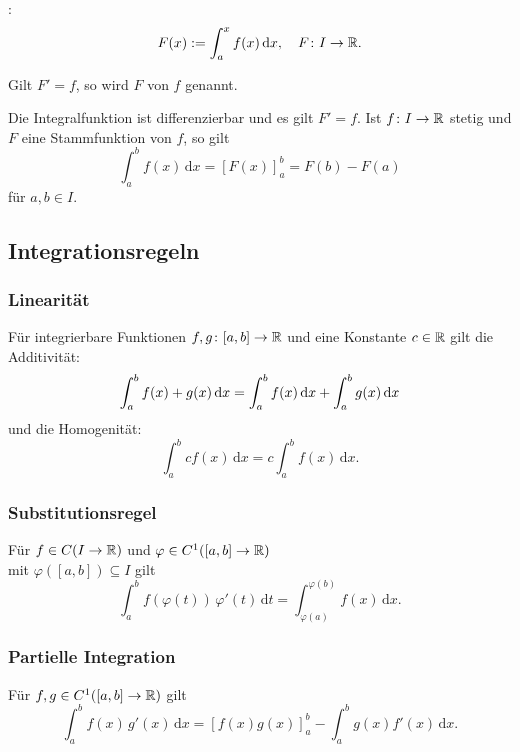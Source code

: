 \begin{definition}[Integralfunktion]
:
\begin{equation}
F(x):=\int_a^x f(x)\,\mathrm dx,\quad F\colon I\to\mathbb R.
\end{equation}
\end{definition}

\begin{definition}[Stammfunktion]
Gilt $F'=f$, so wird $F$  von $f$ genannt.
\end{definition}

Die Integralfunktion ist differenzierbar und es gilt $F'=f$.
Ist $f\colon I\to\mathbb R$ stetig und $F$ eine Stammfunktion von $f$,
so gilt
\begin{equation}\label{eq:Hauptsatz}
\int_a^b f(x)\,\mathrm dx = [F(x)]_{a}^{b} = F(b)-F(a)
\end{equation}
für $a,b\in I$.

\subsection{Integrationsregeln}
\subsubsection{Linearität}
Für integrierbare Funktionen $f,g\colon [a,b]\to\mathbb R$ und eine
Konstante $c\in\mathbb R$ gilt die Additivität:
\begin{equation}
\int_a^b f(x)+g(x)\,\mathrm dx
= \int_a^b f(x)\,\mathrm dx+\int_a^b g(x)\,\mathrm dx\\
\end{equation}
und die Homogenität:
\begin{equation}
\int_a^b c f(x)\,\mathrm dx
= c\int_a^b f(x)\,\mathrm dx.
\end{equation}

\subsubsection{Substitutionsregel}
Für $f\in C(I\to\mathbb R)$ und
$\varphi\in C^1([a,b]\to\mathbb R)$\\
mit $\varphi([a,b])\subseteq I$ gilt%
\begin{equation}
\int_a^b f(\varphi(t))\,\varphi'(t)\,\mathrm dt
= \int_{\varphi(a)}^{\varphi(b)} f(x)\,\mathrm dx.
\end{equation}
\subsubsection{Partielle Integration}
Für $f,g\in C^1([a,b]\to\mathbb R)$ gilt
\begin{equation}
\int_a^b f(x)\,g'(x)\,\mathrm dx = [f(x)g(x)]_a^b
- \int_a^b g(x)f'(x)\,\mathrm dx.
\end{equation}

